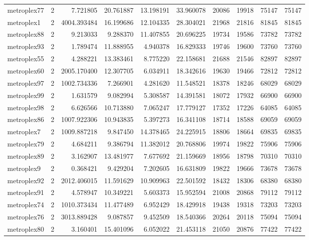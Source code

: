 \begin{longtable}{|l|r|r|r|r|r|r|r|r|r|}
metroplex77 & 2 & 7.721805 & 20.761887 & 13.198191 & 33.960078 & 20086 & 19918 & 75147 & 75147 \\
metroplex1 & 2 & 4004.393484 & 16.199686 & 12.104335 & 28.304021 & 21968 & 21816 & 81845 & 81845 \\
metroplex88 & 2 & 9.213033 & 9.288370 & 11.407855 & 20.696225 & 19734 & 19586 & 73782 & 73782 \\
metroplex93 & 2 & 1.789474 & 11.888955 & 4.940378 & 16.829333 & 19746 & 19600 & 73760 & 73760 \\
metroplex55 & 2 & 4.288221 & 13.383461 & 8.775220 & 22.158681 & 21688 & 21546 & 82897 & 82897 \\
metroplex60 & 2 & 2005.170400 & 12.307705 & 6.034911 & 18.342616 & 19630 & 19466 & 72812 & 72812 \\
metroplex97 & 2 & 1002.734336 & 7.266901 & 4.281620 & 11.548521 & 18378 & 18246 & 68029 & 68029 \\
metroplex99 & 2 & 1.631579 & 9.082994 & 5.308587 & 14.391581 & 18072 & 17932 & 66900 & 66900 \\
metroplex98 & 2 & 6.626566 & 10.713880 & 7.065247 & 17.779127 & 17352 & 17226 & 64085 & 64085 \\
metroplex86 & 2 & 1007.922306 & 10.943835 & 5.397273 & 16.341108 & 18714 & 18588 & 69059 & 69059 \\
metroplex7 & 2 & 1009.887218 & 9.847450 & 14.378465 & 24.225915 & 18806 & 18664 & 69835 & 69835 \\
metroplex79 & 2 & 4.684211 & 9.386794 & 11.382012 & 20.768806 & 19974 & 19822 & 75906 & 75906 \\
metroplex89 & 2 & 3.162907 & 13.481977 & 7.677692 & 21.159669 & 18956 & 18798 & 70310 & 70310 \\
metroplex9 & 2 & 0.368421 & 9.429204 & 7.202605 & 16.631809 & 19822 & 19666 & 73678 & 73678 \\
metroplex92 & 2 & 2012.406015 & 11.591629 & 10.909963 & 22.501592 & 18432 & 18306 & 68380 & 68380 \\
metroplex91 & 2 & 4.578947 & 10.349221 & 5.603373 & 15.952594 & 21008 & 20868 & 79112 & 79112 \\
metroplex74 & 2 & 1010.373434 & 11.477489 & 6.952429 & 18.429918 & 19438 & 19318 & 73203 & 73203 \\
metroplex76 & 2 & 3013.889428 & 9.087857 & 9.452509 & 18.540366 & 20264 & 20118 & 75094 & 75094 \\
metroplex80 & 2 & 3.160401 & 15.401096 & 6.052022 & 21.453118 & 21050 & 20876 & 77422 & 77422 \\

\end{longtable}
